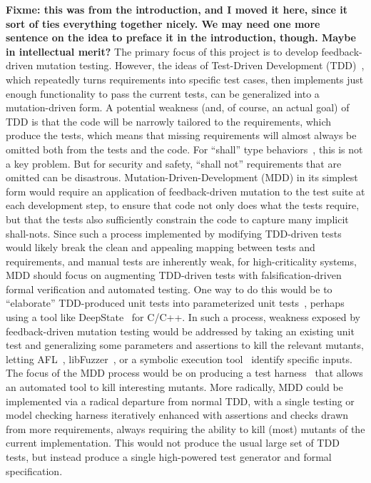 \textbf{Fixme: this was from the introduction, and I moved it here, since it
  sort of ties everything together nicely.  We may need one more sentence on the
  idea to preface it in the introduction, though.  Maybe in intellectual merit?}
The primary focus of this project is to develop feedback-driven mutation testing.  However, the ideas of Test-Driven Development (TDD)~\cite{TDD,TDDFuture}, which repeatedly turns requirements into specific test cases, then implements just enough functionality to pass the current tests, can be generalized into a mutation-driven form.  A potential weakness (and, of course, an actual goal) of TDD is that the code will be narrowly tailored to the requirements, which produce the tests, which means that missing requirements will almost always be omitted both from the tests and the code.  For ``shall'' type behaviors~\cite{INCOSE}, this is not a key problem.  But for security and safety, ``shall not'' requirements that are omitted can be disastrous.  Mutation-Driven-Development (MDD) in its simplest form would require an application of feedback-driven mutation to the test suite at each development step, to ensure that code not only does what the tests require, but that the tests also sufficiently constrain the code to capture many implicit shall-nots.  Since such a process implemented by modifying TDD-driven tests would likely break the clean and appealing mapping between tests and requirements, and manual tests are inherently weak, for high-criticality systems, MDD should focus on augmenting TDD-driven tests with falsification-driven formal verification and automated testing.  One way to do this would be to ``elaborate'' TDD-produced unit tests into parameterized unit tests~\cite{UnitMeister,ParamUnit}, perhaps using a tool like DeepState~\cite{DeepState} for C/C++.  In such a process, weakness exposed by feedback-driven mutation testing would be addressed by taking an existing unit test and generalizing some parameters and assertions to kill the relevant mutants, letting AFL~\cite{aflfuzz}, libFuzzer~\cite{libfuzzer}, or a symbolic execution tool~\cite{angr1,angr2,manticore} identify specific inputs.  The focus of the MDD process would be on producing a test harness~\cite{WODACommon,tstlsttt} that allows an automated tool to kill interesting mutants.  More radically, MDD could be implemented via a radical departure from normal TDD, with a single testing or model checking harness iteratively enhanced with assertions and checks drawn from more requirements, always requiring the ability to kill (most) mutants of the current implementation.  This would not produce the usual large set of TDD tests, but instead produce a single high-powered test generator and formal specification.

